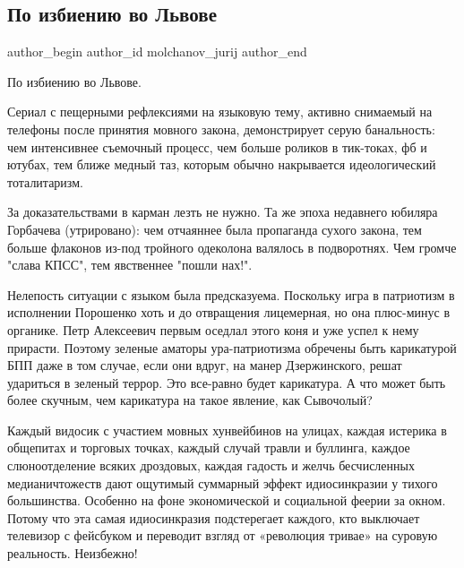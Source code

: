  
 
 
 
 
 
\subsection{По избиению во Львове}
\label{sec:05_03_2021.fb.molchanov_jurij.1.lvov_izbienie_mova}
 
\ifcmt
 author_begin
   author_id molchanov_jurij
 author_end
\fi


По избиению во Львове.

Сериал с пещерными рефлексиями на языковую тему, активно снимаемый на телефоны
после принятия мовного закона, демонстрирует серую банальность: чем интенсивнее
съемочный процесс, чем больше роликов в тик-токах, фб и ютубах, тем ближе
медный таз, которым обычно накрывается идеологический тоталитаризм.

За доказательствами в карман лезть не нужно. Та же эпоха недавнего юбиляра
Горбачева (утрировано): чем отчаяннее была пропаганда сухого закона, тем больше
флаконов из-под тройного одеколона валялось в подворотнях. Чем громче "слава
КПСС", тем явственнее "пошли нах!".

Нелепость ситуации с языком была предсказуема. Поскольку игра в патриотизм в
исполнении Порошенко хоть и до отвращения лицемерная, но она плюс-минус в
органике. Петр Алексеевич первым оседлал этого коня и уже успел к нему
прирасти. Поэтому зеленые аматоры ура-патриотизма обречены быть карикатурой БПП
даже в том случае, если они вдруг, на манер Дзержинского, решат удариться в
зеленый террор. Это все-равно будет карикатура. А что может быть более скучным,
чем карикатура на такое явление, как Сывочолый?

Каждый видосик с участием мовных хунвейбинов на улицах, каждая истерика в
общепитах и торговых точках, каждый случай травли и буллинга, каждое
слюноотделение всяких дроздовых, каждая гадость и желчь бесчисленных
медианичтожеств дают ощутимый суммарный эффект идиосинкразии у тихого
большинства. Особенно на фоне экономической и социальной феерии за окном.
Потому что эта самая идиосинкразия подстерегает каждого, кто выключает
телевизор с фейсбуком и переводит взгляд от «революция тривае» на суровую
реальность. Неизбежно!

